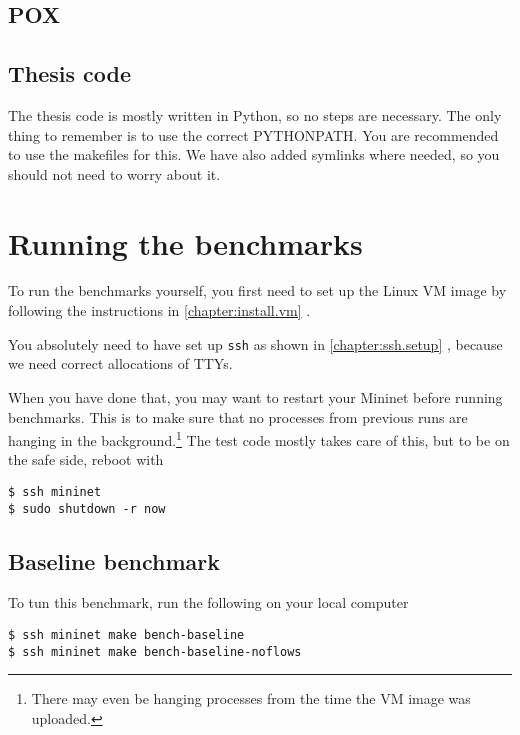 \subsection{POX}


\subsection{Thesis code}

The thesis code is mostly written in Python, so no steps are necessary.
The only thing to remember is to use the correct PYTHONPATH.  You are
recommended to use the makefiles for this. We have also added symlinks where
needed, so you should not need to worry about it.


\section{Running the benchmarks}
\label{chapter:appendix.benchmark}

To run the benchmarks yourself, you first need to set up the Linux VM image
by following the instructions in \ref{chapter:install.vm}
.

You absolutely need to have set up \texttt{ssh} as shown in
\ref{chapter:ssh.setup} , because we need
correct allocations of TTYs.

When you have done that, you may want to restart your Mininet before running
benchmarks.  This is to make sure that no processes from previous runs are
hanging in the background.\footnote{There may even be hanging processes from
the time the VM image was uploaded.} The test code mostly takes care of
this, but to be on the safe side, reboot with

\begin{Verbatim}
$ ssh mininet
$ sudo shutdown -r now
\end{Verbatim}

\subsection{Baseline benchmark}
\label{chapter:appendix.baseline.benchmark}

To tun this benchmark, run the following on your local computer

\begin{Verbatim}
$ ssh mininet make bench-baseline
$ ssh mininet make bench-baseline-noflows
\end{Verbatim}

